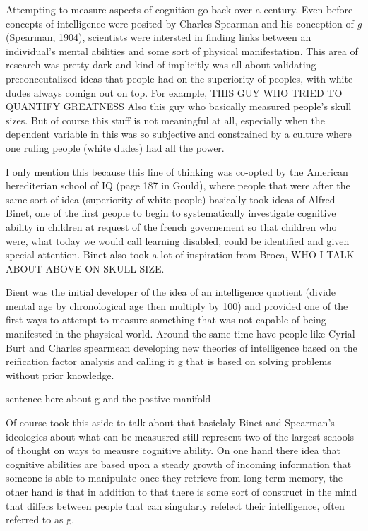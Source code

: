 \documentclass[]{book}
\theoremstyle{definition}
\theoremstyle{definition}
\theoremstyle{definition}
\theoremstyle{remark}
\begin{document}
Attempting to measure aspects of cognition go back over a century. Even
before concepts of intelligence were posited by Charles Spearman and his
conception of \emph{g} (Spearman, 1904), scientists were intersted in
finding links between an individual's mental abilities and some sort of
physical manifestation. This area of research was pretty dark and kind
of implicitly was all about validating preconceutalized ideas that
people had on the superiority of peoples, with white dudes always comign
out on top. For example, THIS GUY WHO TRIED TO QUANTIFY GREATNESS Also
this guy who basically measured people's skull sizes. But of course this
stuff is not meaningful at all, especially when the dependent variable
in this was so subjective and constrained by a culture where one ruling
people (white dudes) had all the power.

I only mention this because this line of thinking was co-opted by the
American herediterian school of IQ (page 187 in Gould), where people
that were after the same sort of idea (superiority of white people)
basically took ideas of Alfred Binet, one of the first people to begin
to systematically investigate cognitive ability in children at request
of the french governement so that children who were, what today we would
call learning disabled, could be identified and given special attention.
Binet also took a lot of inspiration from Broca, WHO I TALK ABOUT ABOVE
ON SKULL SIZE.

Bient was the initial developer of the idea of an intelligence quotient
(divide mental age by chronological age then multiply by 100) and
provided one of the first ways to attempt to measure something that was
not capable of being manifested in the phsysical world. Around the same
time have people like Cyrial Burt and Charles spearmean developing new
theories of intelligence based on the reification factor analysis and
calling it g that is based on solving problems without prior knowledge.

sentence here about g and the postive manifold

Of course took this aside to talk about that basiclaly Binet and
Spearman's ideologies about what can be measusred still represent two of
the largest schools of thought on ways to meausre cognitive ability. On
one hand there idea that cognitive abilities are based upon a steady
growth of incoming information that someone is able to manipulate once
they retrieve from long term memory, the other hand is that in addition
to that there is some sort of construct in the mind that differs between
people that can singularly refelect their intelligence, often referred
to as g.
\end{document}
